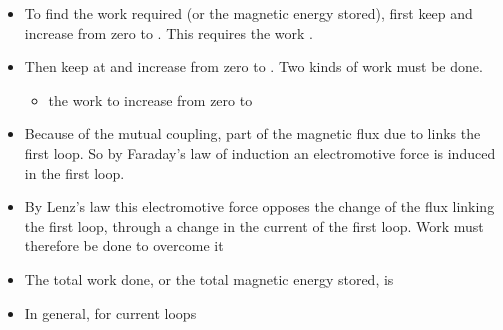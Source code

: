 \begin{ELunit}
\begin{itemize}
  \begin{itemize}
  \tightlist
  \item
    To find the work required (or the magnetic energy stored), first keep  and increase  from zero to . This requires the work .
  \item
    Then keep  at  and increase  from zero to . Two kinds of work must be done.

    \begin{itemize}
    \tightlist
    \item
      the work  to increase  from zero to 
    \end{itemize}
  \end{itemize}
\end{itemize}


\begin{itemize}
\tightlist
\item
  Because of the mutual coupling, part of the magnetic flux due to  links the first loop. So by Faraday's law of induction an electromotive force is induced in the first loop.
\end{itemize}


\begin{itemize}
\tightlist
\item
  By Lenz's law this electromotive force opposes the change of the flux linking the first loop, through a change in the current of the first loop. Work must therefore be done to overcome it
\end{itemize}


\begin{itemize}
\tightlist
\item
  The total work done, or the total magnetic energy stored, is
\end{itemize}


\begin{itemize}
\tightlist
\item
  In general, for  current loops
\end{itemize}


\end{ELunit}
